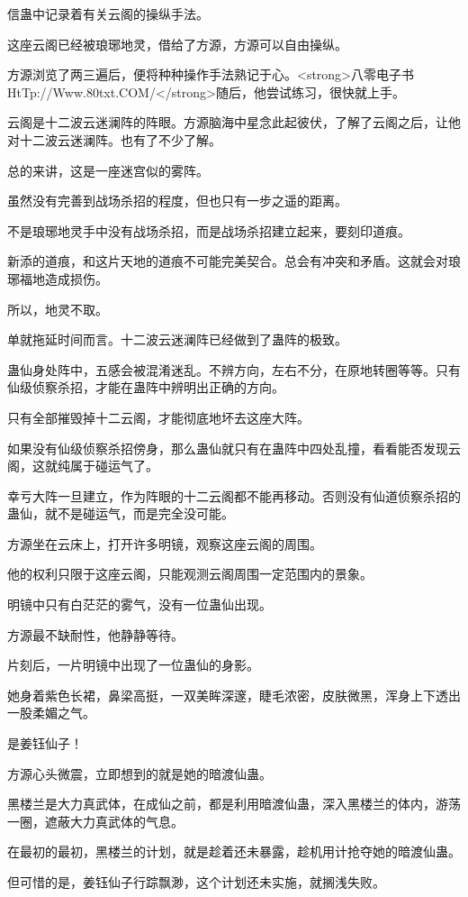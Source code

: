 \begin{this_body}
信蛊中记录着有关云阁的操纵手法。

这座云阁已经被琅琊地灵，借给了方源，方源可以自由操纵。

方源浏览了两三遍后，便将种种操作手法熟记于心。<strong>八零电子书HtTp://Www.80txt.COM/</strong>随后，他尝试练习，很快就上手。

云阁是十二波云迷澜阵的阵眼。方源脑海中星念此起彼伏，了解了云阁之后，让他对十二波云迷澜阵。也有了不少了解。

总的来讲，这是一座迷宫似的雾阵。

虽然没有完善到战场杀招的程度，但也只有一步之遥的距离。

不是琅琊地灵手中没有战场杀招，而是战场杀招建立起来，要刻印道痕。

新添的道痕，和这片天地的道痕不可能完美契合。总会有冲突和矛盾。这就会对琅琊福地造成损伤。

所以，地灵不取。

单就拖延时间而言。十二波云迷澜阵已经做到了蛊阵的极致。

蛊仙身处阵中，五感会被混淆迷乱。不辨方向，左右不分，在原地转圈等等。只有仙级侦察杀招，才能在蛊阵中辨明出正确的方向。

只有全部摧毁掉十二云阁，才能彻底地坏去这座大阵。

如果没有仙级侦察杀招傍身，那么蛊仙就只有在蛊阵中四处乱撞，看看能否发现云阁，这就纯属于碰运气了。

幸亏大阵一旦建立，作为阵眼的十二云阁都不能再移动。否则没有仙道侦察杀招的蛊仙，就不是碰运气，而是完全没可能。

方源坐在云床上，打开许多明镜，观察这座云阁的周围。

他的权利只限于这座云阁，只能观测云阁周围一定范围内的景象。

明镜中只有白茫茫的雾气，没有一位蛊仙出现。

方源最不缺耐性，他静静等待。

片刻后，一片明镜中出现了一位蛊仙的身影。

她身着紫色长裙，鼻梁高挺，一双美眸深邃，睫毛浓密，皮肤微黑，浑身上下透出一股柔媚之气。

是姜钰仙子！

方源心头微震，立即想到的就是她的暗渡仙蛊。

黑楼兰是大力真武体，在成仙之前，都是利用暗渡仙蛊，深入黑楼兰的体内，游荡一圈，遮蔽大力真武体的气息。

在最初的最初，黑楼兰的计划，就是趁着还未暴露，趁机用计抢夺她的暗渡仙蛊。

但可惜的是，姜钰仙子行踪飘渺，这个计划还未实施，就搁浅失败。


\end{this_body}

